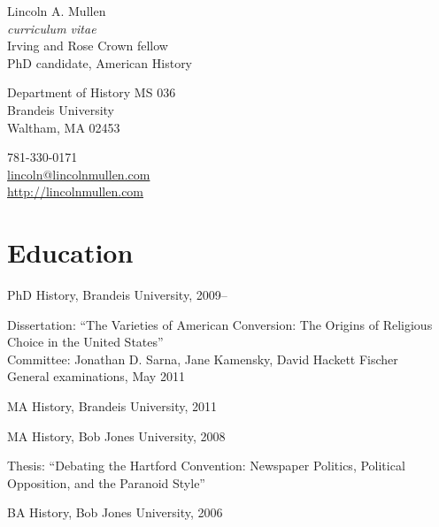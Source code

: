 \documentclass[11pt]{article}
\begin{document}
{\LARGE Lincoln A. Mullen}\\
\emph{curriculum vitae}\\[0.5cm]

Irving and Rose Crown fellow\\
PhD candidate, American History

\begin{multicols}{2}
  Department of History MS 036\\
  Brandeis University\\
  Waltham, MA 02453

  \columnbreak

  781-330-0171\\
  \href{mailto:lincoln@lincolnmullen.com}{lincoln@lincolnmullen.com}\\
  \href{http://lincolnmullen.com}{http://lincolnmullen.com}
\end{multicols}


\vskip 0.5cm


\section{Education}
PhD History, Brandeis University, 2009--

\begingroup
{}
Dissertation: ``The Varieties of American Conversion: The Origins of 
Religious Choice in the United States''\\[1pt]
Committee:  Jonathan D. Sarna, Jane Kamensky, David Hackett 
Fischer\\[1pt]
General examinations, May 2011
\par
\endgroup

MA History, Brandeis University, 2011

MA History, Bob Jones University, 2008

\begingroup
{}
Thesis: ``Debating the Hartford Convention: Newspaper Politics, Political 
Opposition, and the Paranoid Style''
\par
\endgroup

BA History, Bob Jones University, 2006

\end{document}

